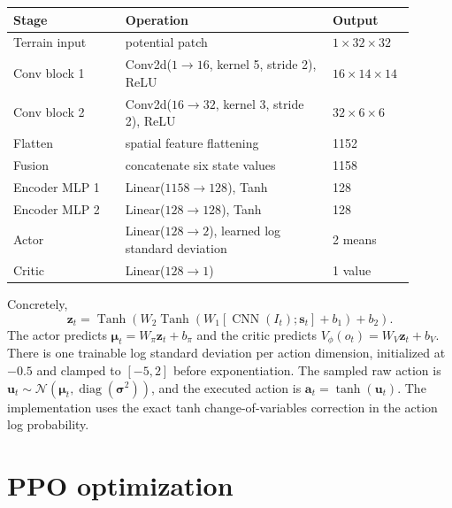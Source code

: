\documentclass[10pt]{article}
\begin{document}
\begin{center}
\renewcommand{\arraystretch}{1.22}
\begin{tabular}{>{\raggedright\arraybackslash}p{0.26\linewidth}p{0.48\linewidth}p{0.16\linewidth}}
\toprule
\textbf{Stage} & \textbf{Operation} & \textbf{Output} \\
\midrule
Terrain input & potential patch & $1\times32\times32$ \\
Conv block 1 & Conv2d($1\rightarrow16$, kernel 5, stride 2), ReLU & $16\times14\times14$ \\
Conv block 2 & Conv2d($16\rightarrow32$, kernel 3, stride 2), ReLU & $32\times6\times6$ \\
Flatten & spatial feature flattening & 1152 \\
Fusion & concatenate six state values & 1158 \\
Encoder MLP 1 & Linear($1158\rightarrow128$), Tanh & 128 \\
Encoder MLP 2 & Linear($128\rightarrow128$), Tanh & 128 \\
Actor & Linear($128\rightarrow2$), learned log standard deviation & 2 means \\
Critic & Linear($128\rightarrow1$) & 1 value \\
\bottomrule
\end{tabular}
\end{center}

Concretely,
\begin{equation}
 \mathbf{z}_t =
 \operatorname{Tanh}\left(W_2
 \operatorname{Tanh}\left(W_1[\operatorname{CNN}(I_t);\mathbf{s}_t]+b_1\right)+b_2\right).
\end{equation}
The actor predicts $\boldsymbol{\mu}_t=W_\pi\mathbf{z}_t+b_\pi$ and the critic
predicts $V_\phi(o_t)=W_V\mathbf{z}_t+b_V$. There is one trainable log standard
deviation per action dimension, initialized at $-0.5$ and clamped to $[-5,2]$
before exponentiation. The sampled raw action is
$\mathbf{u}_t\sim\mathcal{N}(\boldsymbol{\mu}_t,\operatorname{diag}(\boldsymbol{\sigma}^2))$,
and the executed action is $\mathbf{a}_t=\tanh(\mathbf{u}_t)$. The implementation
uses the exact tanh change-of-variables correction in the action log probability.

\section{PPO optimization}
\end{document}
